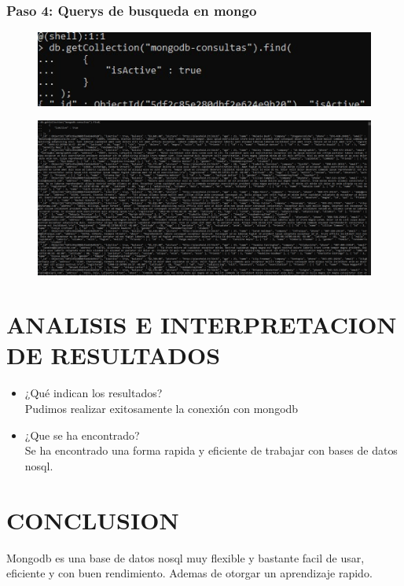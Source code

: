 \documentclass[preprint,12pt]{elsarticle}
\begin{document}
\subsubsection{\textbf{Paso 4: Querys de busqueda en mongo}}
\begin{figure}[H]
	\begin{center}
		\includegraphics[width=12cm]{./IMAGENES/11} 
	\end{center}
\end{figure}

\begin{figure}[H]
	\begin{center}
		\includegraphics[width=12cm]{./IMAGENES/12} 
	\end{center}
\end{figure}


\section{ANALISIS E INTERPRETACION DE RESULTADOS }
\begin{itemize}
	\item ¿Qué indican los resultados? \\
	Pudimos realizar exitosamente la conexión con mongodb
	\item ¿Que se ha encontrado?\\
	Se ha encontrado una forma rapida y eficiente de trabajar con bases de datos nosql.
\end{itemize}



\section{CONCLUSION}
Mongodb es una base de datos nosql muy flexible y bastante facil de usar, eficiente y con buen rendimiento. Ademas de otorgar un aprendizaje rapido.
\end{document}
